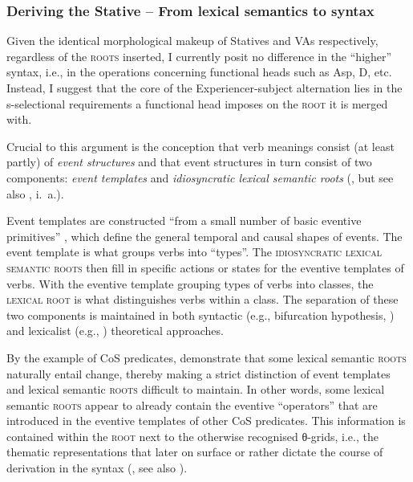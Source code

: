 \documentclass[output=paper,colorlinks,citecolor=brown]{langscibook}
\begin{document}
\subsubsection{Deriving the Stative -- From lexical semantics to syntax}\label{sec:synsem_derivation}

Given the identical morphological makeup of Statives and VAs respectively, regardless of the \textsc{roots} inserted, I currently posit no difference in the ``higher'' syntax, i.e., in the operations concerning functional heads such as Asp, D, etc. Instead, I suggest that the core of the Experiencer-subject alternation lies in the s-selectional requirements a functional head imposes on the \textsc{root} it is merged with.

Crucial to this argument is the conception that verb meanings consist (at least partly) of \textit{event structures} and that event structures in turn consist of two components: \textit{event templates} and \textit{idiosyncratic lexical semantic roots} (\cite[2]{Beaversetal2021}, but see also \cite{dowty_word_1979,LevinRappaport1995,rappaport_hovav_building_1998}, i.\ a.).

Event templates are constructed ``from a small number of basic eventive primitives'' \citep[2]{Beaversetal2021}, which define the general temporal and causal shapes of events. The event template is what groups verbs into “types”. The \textsc{idiosyncratic lexical semantic roots} then fill in specific actions or states for the eventive templates of verbs. With the eventive template grouping types of verbs into classes, the \textsc{lexical root} is what distinguishes verbs within a class. The separation of these two components is maintained in both syntactic (e.g., bifurcation hypothesis, \cite{Marantz1997,Embick2004,harley_lexical_2012}) and lexicalist (e.g., \cite{LevinRappaport1995,rappaport_hovav_building_1998,BeaversKoontz2020}) theoretical approaches. 

By the example of CoS  predicates, \citet{Beaversetal2021} demonstrate that some lexical semantic \textsc{roots} naturally entail change, thereby making a strict distinction of event templates and lexical semantic \textsc{roots} difficult to maintain. In other words, some lexical semantic \textsc{roots} appear to already contain the eventive “operators” that are introduced in the eventive templates of other CoS  predicates. This information is contained within the \textsc{root} next to the otherwise recognised θ-grids, i.e., the thematic representations that later on surface or rather dictate the course of derivation in the syntax (\cite[291]{belletti_psych-verbs_1988}, see also \cite{irwin_semantic_2020,Kastner2020}).
\end{document}
